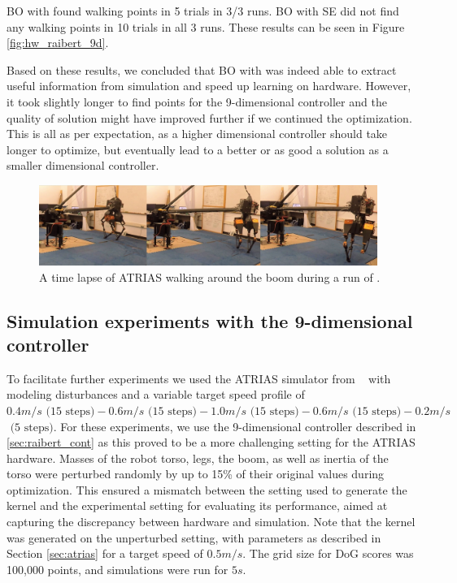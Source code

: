 BO with \dogkernel found walking points in 5 trials in 3/3 runs. BO with SE did not find any walking points in 10 trials in all 3 runs. These results can be seen in Figure \ref{fig:hw_raibert_9d}.

Based on these results, we concluded that BO with \dogkernel was indeed able to extract useful information from simulation and speed up learning on hardware. However, it took slightly longer to find points for the 9-dimensional controller and the quality of solution might have improved further if we continued the optimization. This is all as per expectation, as a higher dimensional controller should take longer to optimize, but eventually lead to a better or as good a solution as a smaller dimensional controller. 

\begin{figure}
\centering
\includegraphics[width=0.98\textwidth]{img/atrias_time_lapse.jpg}
\caption{\small{A time lapse of ATRIAS walking around the boom during a run of \dogkernel.}}
\label{fig:bo_runs_atrias_hw_slides}
\end{figure}


\subsection{Simulation experiments with the 9-dimensional controller}

\label{sec:exps_sim}

To facilitate further experiments we used the ATRIAS simulator from ~\cite{martin2015robust} with modeling disturbances and a variable target speed profile of $0.4 m/s \text{ (15 steps)} - 0.6 m/s \text{ (15 steps)} - 1.0 m/s \text{ (15 steps)} - 0.6 m/s \text{ (15 steps)} - 0.2 m/s$ $\text{ (5 steps)}$. For these experiments, we use the 9-dimensional controller described in \ref{sec:raibert_cont} as this proved to be a more challenging setting for the ATRIAS hardware. Masses of the robot torso, legs, the boom, as well as inertia of the torso were perturbed randomly by up to 15\% of their original values during optimization. This ensured a mismatch between the setting used to generate the kernel and the experimental setting for evaluating its performance, aimed at capturing the discrepancy between hardware and simulation. Note that the kernel was generated on the unperturbed setting, with parameters as described in Section \ref{sec:atrias} for a target speed of $0.5m/s$. The grid size for DoG scores was 100,000 points, and simulations were run for $5s$.

